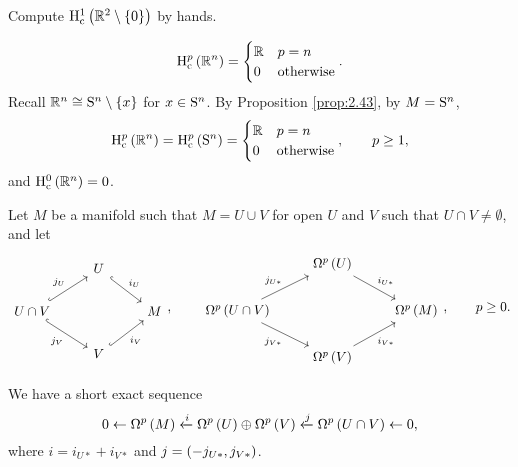 \begin{exercise*}
Compute $ \H_\c^1\br{\RR^2 \setminus \cbr{0}} $ by hands.
\end{exercise*}

\begin{example}
$$ \H_\c^p\br{\RR^n} =
\begin{cases}
\RR & p = n \\
0 & \text{otherwise}
\end{cases}.
$$
Recall $ \RR^n \cong \S^n \setminus \cbr{x} $ for $ x \in \S^n $. By Proposition \ref{prop:2.43}, by $ M = \S^n $,
$$ \H_\c^p\br{\RR^n} = \H_\c^p\br{\S^n} =
\begin{cases}
\RR & p = n \\
0 & \text{otherwise}
\end{cases},
\qquad p \ge 1, $$
and $ \H_\c^0\br{\RR^n} = 0 $.
\end{example}

\pagebreak


Let $ M $ be a manifold such that $ M = U \cup V $ for open $ U $ and $ V $ such that $ U \cap V \ne \emptyset $, and let
$$
\begin{tikzcd}
& U \arrow[hookrightarrow]{dr}{i_U} & \\
U \cap V \arrow[hookrightarrow]{ur}{j_U} \arrow[hookrightarrow]{dr}[swap]{j_V} & & M \\
& V \arrow[hookrightarrow]{ur}[swap]{i_V} &
\end{tikzcd},
\qquad
\begin{tikzcd}
& \Omega^p\br{U} \arrow{dr}{i_{U*}} & \\
\Omega^p\br{U \cap V} \arrow{ur}{j_{U*}} \arrow{dr}[swap]{j_{V*}} & & \Omega^p\br{M} \\
& \Omega^p\br{V} \arrow{ur}[swap]{i_{V*}} &
\end{tikzcd},
\qquad p \ge 0. $$

\begin{proposition}
We have a short exact sequence
$$ 0 \leftarrow \Omega^p\br{M} \xleftarrow{i} \Omega^p\br{U} \oplus \Omega^p\br{V} \xleftarrow{j} \Omega^p\br{U \cap V} \leftarrow 0, $$
where $ i = i_{U*} + i_{V*} $ and $ j = \br{-j_{U*}, j_{V*}} $.
\end{proposition}

